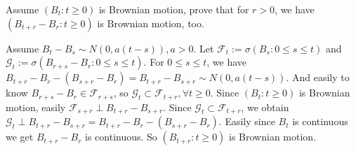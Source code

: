 \documentclass{ctexart}
\newif\ifpreface
\begin{document}
\large
\iffalse
  \setlength{\baselineskip}{1.2em}
  \ifpreface
    
  \else
    \maketitle
  \fi
\fi
{}
\begin{problem}\label{pro:1}
  Assume \((B_t:t \geq 0)\) is Brownian motion, prove that for \(r>0\), we have \((B_{t + r}-B_r:t \geq 0)\) is Brownian motion, too.
\end{problem}
\begin{solution}
  Assume \(B_t-B_s \sim N(0,a(t-s)),a >0\).
  Let \(\mathcal{F}_t:=\sigma(B_s:0 \leq s \leq t)\) and \(\mathcal{G}_t:=\sigma(B_{r+s}-B_r:0 \leq s \leq t)\).
  For \(0 \leq s \leq t\), we have \(B_{t+r}-B_r -(B_{s+r}-B_r)=B_{t+r}-B_{s+r} \sim N(0,a(t-s))\).
  And easily to know \(B_{r + s}-B_r \in \mathcal{F}_{r+s}\), so \(\mathcal{G}_t \subset \mathcal{F}_{t+r},\forall t \geq 0\).
  Since \((B_t:t \geq 0)\) is Brownian motion, easily \(\mathcal{F}_{s+r} \perp B_{t+r}-B_{s+r}\).
  Since \(\mathcal{G}_{t}\subset \mathcal{F}_{t +r}\), we obtain \(\mathcal{G}_t \perp B_{t + r}-B_{s + r}=B_{t+r}-B_r -(B_{s+r}-B_r)\).
  Easily since \(B_t\) is continuous we get \(B_{t + r}-B_r\) is continuous.
  So \((B_{t+r}:t \geq 0)\) is Brownian motion.
\end{solution}
\end{document}
